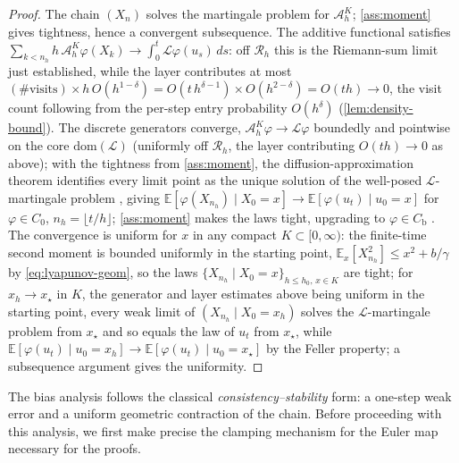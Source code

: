\documentclass[aap,preprint]{imsart}
\numberwithin{equation}{section}
\theoremstyle{plain}
\theoremstyle{definition}
\begin{document}
\begin{proof}
  The chain $(X_n)$ solves the martingale problem for
  $\mathcal{A}_h^K$; \cref{ass:moment} gives tightness, hence a convergent
  subsequence.  The additive functional satisfies
  $\sum_{k<n_h}h\,\mathcal{A}_h^K\varphi(X_k)\to\int_0^t\mathcal{L}\varphi(u_s)\,ds$:
  off $\mathcal{R}_h$ this is the Riemann-sum limit just established, while the
  layer contributes at most
  $(\#\text{visits})\times h\,O(h^{1-\delta})
   =O(t\,h^{\delta-1})\times O(h^{2-\delta})=O(th)\to0$, the visit count
  following from the per-step entry probability $O(h^\delta)$
  (\cref{lem:density-bound}).  The discrete generators converge, $\mathcal{A}_h^K\varphi\to\mathcal{L}\varphi$ boundedly and pointwise on the core $\mathrm{dom}(\mathcal{L})$ (uniformly off $\mathcal{R}_h$, the layer contributing $O(th)\to0$ as above); with the tightness from \cref{ass:moment}, the diffusion-approximation theorem \citep[Thm.~4.8.2]{EthierKurtz1986} identifies every limit point as the unique solution of the well-posed
  $\mathcal{L}$-martingale problem \citep[\S4]{ItoMcKean1965}, giving
  $\mathbb{E}[\varphi(X_{n_h})\mid X_0=x]\to\mathbb{E}[\varphi(u_t)\mid u_0=x]$
  for $\varphi\in C_0$, $n_h=\lfloor t/h\rfloor$; \cref{ass:moment} makes the
  laws tight, upgrading to $\varphi\in C_{\mathrm b}$
  \citep[Theorem~25.10]{Billingsley1999}.  The convergence is uniform for $x$ in any
  compact $K\subset[0,\infty)$: the finite-time second moment is bounded uniformly in the
  starting point, $\mathbb{E}_x[X_{n_h}^2]\le x^2+b/\gamma$ by \eqref{eq:lyapunov-geom}, so the
  laws $\{X_{n_h}\mid X_0=x\}_{h\le h_0,\,x\in K}$ are tight; for $x_h\to x_\star$ in $K$, the
  generator and layer estimates above being uniform in the starting point, every weak limit of
  $(X_{n_h}\mid X_0=x_h)$ solves the $\mathcal{L}$-martingale problem from $x_\star$ and so equals
  the law of $u_t$ from $x_\star$, while
  $\mathbb{E}[\varphi(u_t)\mid u_0=x_h]\to\mathbb{E}[\varphi(u_t)\mid u_0=x_\star]$ by the Feller
  property; a subsequence argument gives the uniformity.
\end{proof}

The bias analysis follows the classical \emph{consistency--stability} form: a one-step weak error and a uniform geometric contraction of the chain.  Before proceeding with this analysis, we first make precise the clamping mechanism for the Euler map necessary for the proofs.
\end{document}
